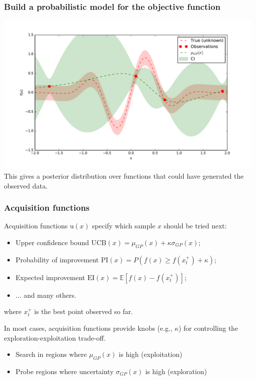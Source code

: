 \documentclass{beamer}
\begin{document}
\begin{frame}
    \frametitle{Build a probabilistic model for the objective function}
    \begin{center}
        \includegraphics[width=\textwidth]{code/fig2.pdf} \\
        This gives a posterior distribution over functions that could have generated the observed data.
    \end{center}
\end{frame}

\begin{frame}
    \frametitle{Acquisition functions}

    Acquisition functions $\text{u}(x)$ specify which sample $x$ should be tried next:

    \begin{itemize}
        \item Upper confidence bound
            $\text{UCB}(x) = \mu_{GP}(x) + \kappa \sigma_{GP}(x)$;
        \item Probability of improvement
            $\text{PI}(x) = P(f(x) \geq f(x_t^+) + \kappa) $;
        \item Expected improvement
            $\text{EI}(x) = \mathbb{E} [f(x) - f(x_t^+)] $;
        \item ... and many others.
    \end{itemize}

    where $x_t^+$ is the best point observed so far.

    \vspace{1em}

    In most cases, acquisition functions provide knobs (e.g., $\kappa$) for
    controlling the exploration-exploitation trade-off.
        \begin{itemize}
            \item Search in regions where $\mu_{GP}(x)$ is high (exploitation)
            \item Probe regions where uncertainty $\sigma_{GP}(x)$ is high (exploration)
        \end{itemize}

\end{frame}
\end{document}
